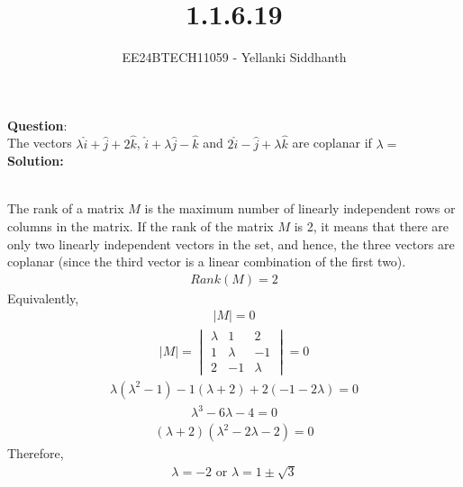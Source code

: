 \documentclass[journal]{IEEEtran}
\begin{document}

\vspace{3cm}

\title{1.1.6.19}
\author{EE24BTECH11059 - Yellanki Siddhanth
}
{\let\newpage\relax\maketitle}

\renewcommand{\thefigure}{\theenumi}
\renewcommand{\thetable}{\theenumi}
\setlength{\intextsep}{10pt} %


\renewcommand{\thetable}{\theenumi}


\textbf{Question}:\\

The vectors $\lambda\hat{i} + \hat{j} +2\hat{k}$, $\hat{i} + \lambda\hat{j} - \hat{k}$ and $2\hat{i} - \hat{j} +\lambda\hat{k}$  are coplanar if $\lambda = $
\\ \textbf{Solution: }\\
    \begin{table}[h!]    
      \centering
      
      \caption{}
    \end{table}\\
The rank of a matrix $M$ is the maximum number of linearly independent rows or columns in the matrix. If the rank of the matrix $M$ is 2, it means that there are only two linearly independent vectors in the set, and hence, the three vectors are coplanar (since the third vector is a linear combination of the first two).
    \begin{align}
        Rank(M) = 2\label{eq1.1.6.19.1}
    \end{align}
Equivalently,
    \begin{align}
        |M| = 0 \label{eq1.1.6.19.2}
    \end{align}
    \begin{align}
        |M| = \begin{vmatrix}\lambda & 1 & 2 \\ 1 & \lambda & -1 \\ 2 & -1 & \lambda\end{vmatrix}=0\label{eq1.1.6.19.3}
    \end{align}
    \begin{align}
        \lambda(\lambda^2 - 1) - 1(\lambda+2) + 2(-1-2\lambda) = 0  \label{eq1.1.6.19.4}
    \end{align}
    \begin{align}
        \lambda^3 - 6\lambda - 4 = 0  \label{eq1.1.6.19.5}
    \end{align}
    \begin{align}
        (\lambda + 2)(\lambda^2 - 2\lambda - 2) = 0  \label{eq1.1.6.19.6}
    \end{align}
Therefore,
    \begin{align}
         \lambda = -2 \text{ or } \lambda = 1 \pm \sqrt{3}\label{eq1.1.6.19.6}
    \end{align}
    
\end{document}
